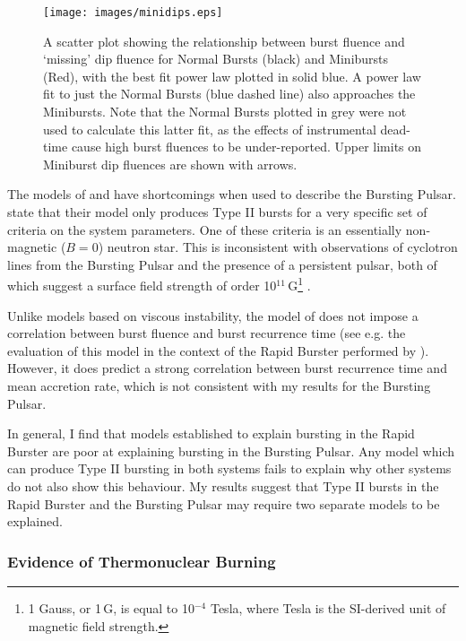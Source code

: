 \begin{figure}
  \centering
  \texttt{[image: images/minidips.eps]}
  \caption[A scatter plot showing the relationship between burst fluence and `missing' dip fluence for Normal Bursts and Minibursts.]{\small A scatter plot showing the relationship between burst fluence and `missing' dip fluence for Normal Bursts (black) and Minibursts (Red), with the best fit power law plotted in solid blue.  A power law fit to just the Normal Bursts (blue dashed line) also approaches the Minibursts.  Note that the Normal Bursts plotted in grey were not used to calculate this latter fit, as the effects of instrumental dead-time cause high burst fluences to be under-reported.  Upper limits on Miniburst dip fluences are shown with arrows.}
  \label{fig:minidips}
\end{figure}

\par The models of \citet{Spruit_Type2Mod} and \citet{Walker_Type2Mod} have shortcomings when used to describe the Bursting Pulsar.  \citet{Walker_Type2Mod} state that their model only produces Type II bursts for a very specific set of criteria on the system parameters.   One of these criteria is an essentially non-magnetic ($B=0$) neutron star.  This is inconsistent with observations of cyclotron lines from the Bursting Pulsar and the presence of a persistent pulsar, both of which suggest a surface field strength of order 10$^{11}$\,G\footnote{1 Gauss, or 1\,G, is equal to 10$^{-4}$ Tesla, where Tesla is the SI-derived unit of magnetic field strength.} \citep{Doroshenko_NBFlash}.
\par Unlike models based on viscous instability, the model of \citet{Spruit_Type2Mod} does not impose a correlation between burst fluence and burst recurrence time (see e.g. the evaluation of this model in the context of the Rapid Burster performed by \citealp{Bagnoli_PopStudy}).  However, it does predict a strong correlation between burst recurrence time and mean accretion rate, which is not consistent with my results for the Bursting Pulsar.
\par In general, I find that models established to explain bursting in the Rapid Burster are poor at explaining bursting in the Bursting Pulsar.  Any model which can produce Type II bursting in both systems fails to explain why other systems do not also show this behaviour.  My results suggest that Type II bursts in the Rapid Burster and the Bursting Pulsar may require two separate models to be explained.

\subsubsection{Evidence of Thermonuclear Burning}

